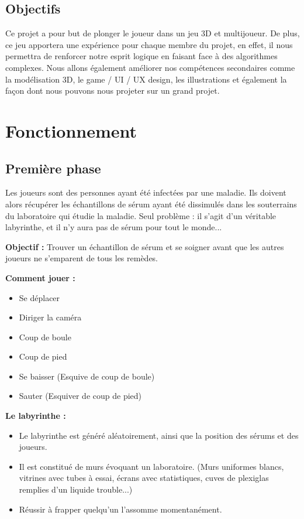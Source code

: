 \documentclass{article}
\begin{document}
\subsection{Objectifs}

Ce projet a pour but de plonger le joueur dans un jeu 3D et multijoueur.
De plus, ce jeu apportera une expérience pour chaque membre du projet, en effet, il nous permettra de renforcer notre esprit logique en faisant face à des algorithmes complexes. Nous allons également améliorer nos compétences secondaires comme la modélisation 3D, le game / UI / UX design, les illustrations et également la façon dont nous pouvons nous projeter sur un grand projet.


\newpage

\section{Fonctionnement}

\subsection{Première phase}
Les joueurs sont des personnes ayant été infectées par une maladie. Ils doivent alors récupérer les échantillons de sérum ayant été dissimulés dans les souterrains du laboratoire qui étudie la maladie. Seul problème : il s'agit d'un véritable labyrinthe, et il n'y aura pas de sérum pour tout le monde...

\textbf{Objectif :} Trouver un échantillon de sérum et se soigner avant que les autres joueurs ne s'emparent de tous les remèdes.

\textbf{Comment jouer :}

\begin{itemize}
	\item Se déplacer
	\item Diriger la caméra
	\item Coup de boule
	\item Coup de pied
	\item Se baisser (Esquive de coup de boule)
	\item Sauter (Esquiver de coup de pied)
\end{itemize}

\textbf{Le labyrinthe :}

\begin{itemize}
	\item Le labyrinthe est généré aléatoirement, ainsi que la position des sérums et des joueurs.
	\item Il est constitué de murs évoquant un laboratoire. (Murs uniformes blancs, vitrines avec tubes à essai, écrans avec statistiques, cuves de plexiglas remplies d'un liquide trouble...)
	\item Réussir à frapper quelqu'un l'assomme momentanément.
\end{itemize}
\end{document}
